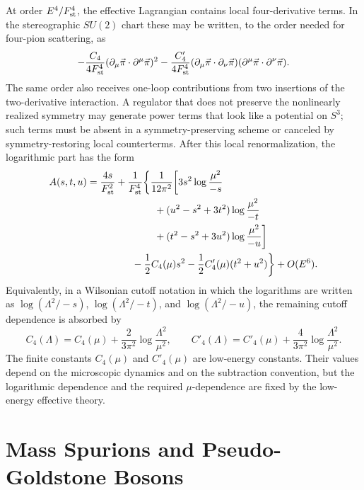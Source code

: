 At order \(E^4/F_{\rm st}^4\), the effective Lagrangian contains local
four-derivative terms.  In the stereographic \(SU(2)\) chart these may be
written, to the order needed for four-pion scattering, as
\[
  -\frac{C_4}{4F_{\rm st}^4}
  (\partial_\mu\vec\pi\cdot\partial^\mu\vec\pi)^2
  -
  \frac{C'_4}{4F_{\rm st}^4}
  (\partial_\mu\vec\pi\cdot\partial_\nu\vec\pi)
  (\partial^\mu\vec\pi\cdot\partial^\nu\vec\pi).
\]
The same order also receives one-loop contributions from two insertions of
the two-derivative interaction.  A regulator that does not preserve the
nonlinearly realized symmetry may generate power terms that look like a
potential on \(S^3\); such terms must be absent in a symmetry-preserving
scheme or canceled by symmetry-restoring local counterterms.  After this
local renormalization, the logarithmic part has the form
\begin{align}
  A(s,t,u)
  &=
  \frac{4s}{F_{\rm st}^2}
  +
  \frac1{F_{\rm st}^4}
  \biggl\{
  \frac1{12\pi^2}
    \biggl[
      3s^2\log\frac{\mu^2}{-s}
      \notag\\
  &\hspace{2.4cm}
      +(u^2-s^2+3t^2)\log\frac{\mu^2}{-t}
      \notag\\
  &\hspace{2.4cm}
      +(t^2-s^2+3u^2)\log\frac{\mu^2}{-u}
    \biggr]
    \notag\\
  &\hspace{1.6cm}
    -\frac12 C_4(\mu)s^2
    -\frac12 C'_4(\mu)(t^2+u^2)
  \biggr\}
  +O(E^6).
  \label{eq:pion-one-loop-chiral-log-amplitude}
\end{align}
Equivalently, in a Wilsonian cutoff notation in which the logarithms are
written as \(\log(\Lambda^2/-s)\), \(\log(\Lambda^2/-t)\), and
\(\log(\Lambda^2/-u)\), the remaining cutoff dependence is absorbed by
\[
  C_4(\Lambda)
  =
  C_4(\mu)+\frac{2}{3\pi^2}\log\frac{\Lambda^2}{\mu^2},
  \qquad
  C'_4(\Lambda)
  =
  C'_4(\mu)+\frac{4}{3\pi^2}\log\frac{\Lambda^2}{\mu^2}.
\]
The finite constants \(C_4(\mu)\) and \(C'_4(\mu)\) are low-energy constants.
Their values depend on the microscopic dynamics and on the subtraction
convention, but the logarithmic dependence and the required \(\mu\)-dependence
are fixed by the low-energy effective theory.

\section{Mass Spurions and Pseudo-Goldstone Bosons}

